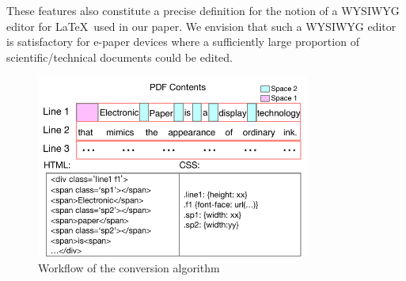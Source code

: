 \documentclass[]{sigchi}
\begin{document}
These features also constitute a precise definition for the notion of a WYSIWYG editor for \LaTeX\ used in our paper. We envision that such a WYSIWYG editor is satisfactory for e-paper devices where a sufficiently large proportion of scientific/technical documents could be edited.


\begin{figure}[t]
\begin{center}
\includegraphics[width=0.8\textwidth]{figures/htmlconvert}
\caption{Workflow of the conversion algorithm}
\label{fig:convertexample}
\end{center}
\end{figure}

\end{document}
